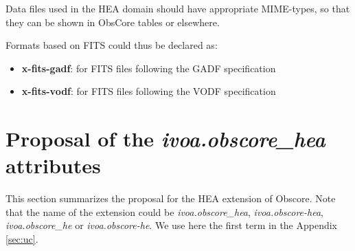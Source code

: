 \documentclass[11pt,a4paper]{ivoa}
\begin{document}
Data files used in the \gls{HEA} domain should have appropriate MIME-types, so that they can be shown in ObsCore tables or elsewhere.

Formats based on FITS could thus be declared as:

\begin{itemize}
\item {\bf x-fits-gadf}: for FITS files following the GADF specification \citep{deil_2022_7304668}
\item {\bf x-fits-vodf}: for FITS files following the VODF specification \citep{2023arXiv230813385K}
\end{itemize}

\section{Proposal of the {\it ivoa.obscore\_hea} attributes}\label{sec:ibscoreext}

This section summarizes the proposal for the \gls{HEA} extension of Obscore. Note that the name of the extension could be {\it ivoa.obscore\_hea}, {\it ivoa.obscore-hea}, {\it ivoa.obscore\_he} or {\it ivoa.obscore-he}. We use here the first term in the Appendix \ref{sec:uc}.
\end{document}
